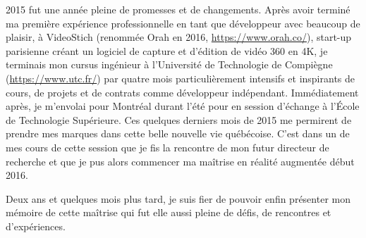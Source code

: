2015 fut une année pleine de promesses et de changements. Après avoir terminé ma première expérience professionnelle en tant que développeur avec beaucoup de plaisir, à VideoStich (renommée Orah en 2016, \url{https://www.orah.co/}), start-up parisienne créant un logiciel de capture et d'édition de vidéo 360 en 4K, je terminais mon cursus ingénieur à l'Université de Technologie de Compiègne (\url{https://www.utc.fr/}) par quatre mois particulièrement intensifs et inspirants de cours, de projets et de contrats comme développeur indépendant. Immédiatement après, je m'envolai pour Montréal durant l'été pour en session d'échange à l'École de Technologie Supérieure. Ces quelques derniers mois de 2015 me permirent de prendre mes marques dans cette belle nouvelle vie québécoise. C'est dans un de mes cours de cette session que je fis la rencontre de mon futur directeur de recherche et que je pus alors commencer ma maîtrise en réalité augmentée début 2016.

Deux ans et quelques mois plus tard, je suis fier de pouvoir enfin présenter mon mémoire de cette maîtrise qui fut elle aussi pleine de défis, de rencontres et d'expériences.